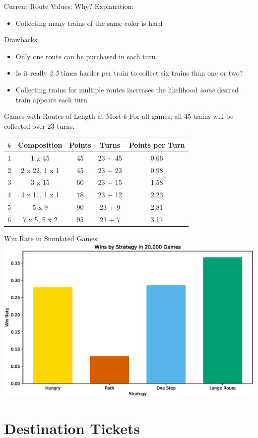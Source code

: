 \documentclass[12pt]{beamer}
\begin{document}
\begin{frame}{Current Route Values: Why?}
    Explanation: 
    \begin{itemize}
    \item Collecting many trains of the same 
    color is hard\footnotemark
    \end{itemize}
    \vspace{.5cm}
    \pause
    Drawbacks: 
    \begin{itemize}
    \item Only one route can be purchased in each turn
    \item Is it really \textit{2.5} times harder per train to 
    collect six trains than one or two?
    \item Collecting trains for multiple routes 
    increases the likelihood \textit{some} desired 
    train appears each turn
    \end{itemize}
\end{frame}

\begin{frame}{Games with Routes of Length at Most $k$}
    For all games, all 45 trains will be collected over 23 turns.\footnotemark[2]
    
    \vspace{.5cm}
    \renewcommand{\arraystretch}{1.5}
    \begin{tabular}{| c | c | c | c | c |}
    \hline
    $k$ & Composition & Points & Turns & Points per Turn\\
    \hline
    1 & 1 x 45 & 45 & 23 + 45 & 0.66\\
    \hline
    2 & 2 x 22, 1 x 1 & 45 & 23 + 23 & 0.98\\
    \hline
    3 & 3 x 15 & 60 & 23 + 15 & 1.58\\
    \hline
    4 & 4 x 11, 1 x 1 & 78 & 23 + 12 & 2.23\\
    \hline
    5 & 5 x 9 & 90 & 23 + 9 & 2.81\\
    \hline
    6 & 7 x 5, 5 x 2 & 95 & 23 + 7 & 3.17\\
    \hline
    \end{tabular}
\end{frame}

\begin{frame}{Win Rate in Simulated Games}
\centering
\includegraphics[scale=.45]{"figures/win_rates"}
    
\end{frame}

\section{Destination Tickets}
\end{document}
